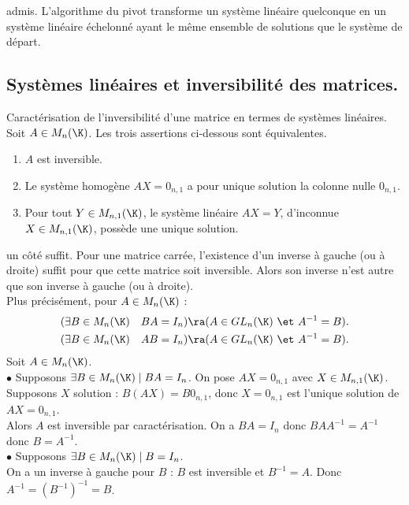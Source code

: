 \documentclass[11pt]{article}
\begin{document}
\begin{thm}{admis.}{}
    L'algorithme du pivot transforme un système linéaire quelconque en un système linéaire échelonné ayant le même ensemble de solutions que le système de départ.
\end{thm}

\subsection{Systèmes linéaires et inversibilité des matrices.}

\begin{thm}{Caractérisation de l'inversibilité d'une matrice en termes de systèmes linéaires.}{}
    Soit $A\in M_n(\K)$. Les trois assertions ci-dessous sont équivalentes.
    \begin{enumerate}
        \item $A$ est inversible.
        \item Le système homogène $AX=0_{n,1}$ a pour unique solution la colonne nulle $0_{n,1}$.
        \item Pour tout $Y\in M_{n,1}(\K)$, le système linéaire $AX=Y$, d'inconnue $X\in M_{n,1}(\K)$, possède une unique solution.
    \end{enumerate}
\end{thm}

\pagebreak

\begin{corr}{un côté suffit.}{}
    Pour une matrice carrée, l'existence d'un inverse à gauche (ou à droite) suffit pour que cette matrice soit inversible. Alors son inverse n'est autre que son inverse à gauche (ou à droite).\\
    Plus précisément, pour $A\in M_{n}(\K)$ :
    \begin{align*}
        (\exists B \in M_n(\K) \quad BA=I_n) \ra (A \in GL_n(\K) ~\et~ A^{-1}=B).\\
        (\exists B\in M_n(\K) \quad AB=I_n) \ra (A\in GL_n(\K) ~\et~ A^{-1}=B).
    \end{align*}
    \tcblower
    Soit $A\in M_n(\K)$.\\
    $\bullet$ Supposons $\exists B \in M_n(\K) \mid BA = I_n$. On pose $AX=0_{n,1}$ avec $X\in M_{n,1}(\K)$.\\
    Supposons $X$ solution : $B(AX)=B0_{n,1}$, donc $X=0_{n,1}$ est l'unique solution de $AX=0_{n,1}$.\\
    Alors $A$ est inversible par caractérisation. On a $BA=I_n$ donc $BAA^{-1}=A^{-1}$ donc $B=A^{-1}$.\\
    $\bullet$ Supposons $\exists B \in M_n(\K)\mid B=I_n$.\\
    On a un inverse à gauche pour $B$ : $B$ est inversible et $B^{-1}=A$. Donc $A^{-1}=(B^{-1})^{-1}=B$. 
\end{corr}
\end{document}
